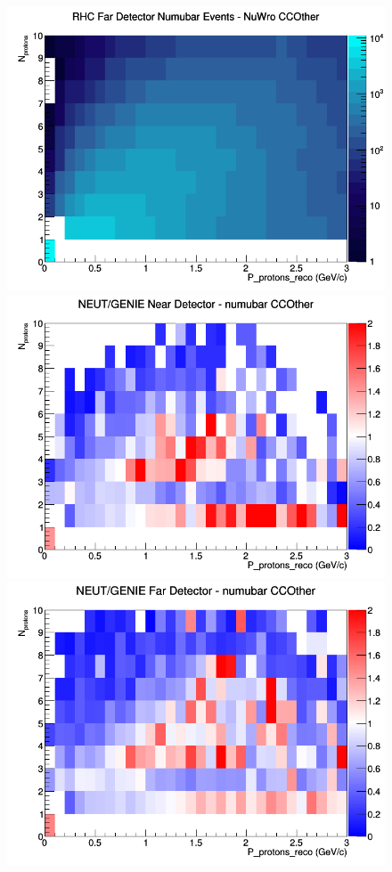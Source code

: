 \documentclass[12pt]{article}
\begin{document}
\begin{figure}[h]
\endminipage
{}
\includegraphics[width=\linewidth]{eff_N_P/LAr/protons/CCOther_RHC_FD_numubar_N_P_NuWro.png}
\endminipage
\newline
{}
\includegraphics[width=\linewidth]{eff_N_P/LAr/protons/ratios/CCOther_NEUT_GENIE_numubar_near_N_P.png}
\endminipage
{}
\includegraphics[width=\linewidth]{eff_N_P/LAr/protons/ratios/CCOther_NEUT_GENIE_numubar_far_N_P.png}

\end{figure}
\end{document}
